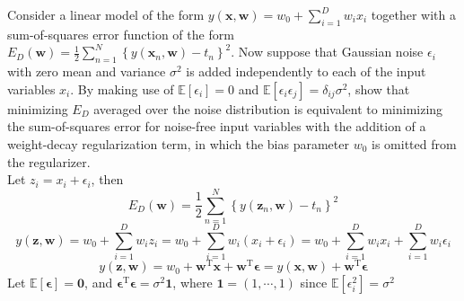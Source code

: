 \documentclass{article}
\begin{document}
 Consider a linear model of the form $y(\mathbf{x}, \mathbf{w})=w_{0}+\sum_{i=1}^{D} w_{i} x_{i}$ together with a sum-of-squares error function of the form $E_{D}(\mathbf{w})=\frac{1}{2} \sum_{n=1}^{N}\left\{y\left(\mathbf{x}_{n}, \mathbf{w}\right)-t_{n}\right\}^{2}$. Now suppose that Gaussian noise $\epsilon_{i}$ with zero mean and variance $\sigma^{2}$ is added independently to each of the input variables $x_{i} .$ By making use of $\mathbb{E}\left[\epsilon_{i}\right]=0$ and $\mathbb{E}\left[\epsilon_{i} \epsilon_{j}\right]=\delta_{i j} \sigma^{2}$, show that minimizing $E_{D}$ averaged over the noise distribution is equivalent to minimizing the sum-of-squares error for noise-free input variables with the addition of a weight-decay regularization term, in which the bias parameter $w_{0}$ is omitted from the regularizer.
\\Let $z_{i}=x_{i}+\epsilon_{i}$, then
$$
E_{D}(\mathbf{w})=\frac{1}{2} \sum_{n=1}^{N}\left\{y\left(\mathbf{z}_{n}, \mathbf{w}\right)-t_{n}\right\}^{2}
$$
$$
y(\mathbf{z}, \mathbf{w})=w_{0}+\sum_{i=1}^{D} w_{i} z_{i}=w_{0}+\sum_{i=1}^{D} w_{i}\left(x_{i}+\epsilon_{i}\right)=w_{0}+\sum_{i=1}^{D} w_{i} x_{i}+\sum_{i=1}^{D} w_{i} \epsilon_{i}$$
$$
y(\mathbf{z}, \mathbf{w})=w_{0}+\mathbf{w}^{\mathrm{T}} \mathbf{x}+\mathbf{w}^{\mathrm{T}} \boldsymbol{\epsilon}=y(\mathbf{x}, \mathbf{w})+\mathbf{w}^{\mathrm{T}} \boldsymbol{\epsilon}
$$
Let $\mathbb{E}[\boldsymbol{\epsilon}]=\mathbf{0}$, and $\boldsymbol{\epsilon}^{\mathrm{T}} \boldsymbol{\epsilon}=\sigma^{2} \mathbf{1}$, where $\mathbf{1}=(1, \cdots, 1)$ since $\mathbb{E}\left[\epsilon_{i}^{2}\right]=\sigma^{2}$
\end{document}
